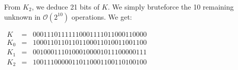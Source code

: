 \documentclass[a4paper]{article}
\begin{document}
From $K_2$, we deduce 21 bits of $K$. We simply bruteforce the 10 remaining unknown in $\mathcal{O}(2^{10})$ operations. We get:

$
\begin{array}{rcl}
  K   & = & 00011101111110001111011000110000 \\
  K_0 & = & 10001101101101100011010011001100 \\
  K_1 & = & 00100011101000100001011100000111 \\
  K_2 & = & 10011100000110110001100110100100
\end{array}
$


 
\end{document}
